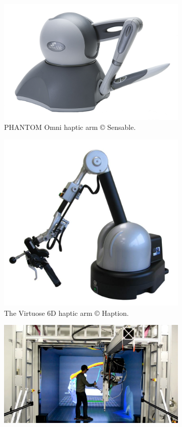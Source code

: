 \begin{figure}[htb]
  \begin{subfigure}{.3\textwidth}
    \centering
    \includegraphics[width=0.8\linewidth]{figures/ch1/phantom}
    \caption{PHANTOM\textregistered{} Omni haptic arm \copyright{} Sensable.}
    \label{fig:1_hi:phantom}
  \end{subfigure}
  \begin{subfigure}{.3\textwidth}
    \centering
    \includegraphics[width=0.8\linewidth]{figures/ch1/virtuose}
    \caption{The Virtuose 6D haptic arm \copyright{} Haption.}
    \label{fig:1_hi:virtuose}
  \end{subfigure}
  \begin{subfigure}{.35\textwidth}
    \centering
    \includegraphics[width=0.9\linewidth]{figures/ch1/scale1}

\end{subfigure}
\end{figure}
